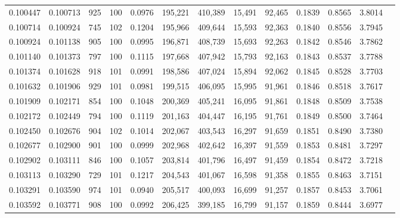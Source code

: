 \begin{tabular}{rrrrrrrrrrrrr}
0.100447 & 0.100713 &   925 & 100 &                                     0.0976 & 195,221 & 410,389 &  15,491 &  92,465 & 0.1839 & 0.8565 & 3.8014 \\
0.100714 & 0.100924 &   745 & 102 &                                     0.1204 & 195,966 & 409,644 &  15,593 &  92,363 & 0.1840 & 0.8556 & 3.7945 \\
0.100924 & 0.101138 &   905 & 100 &                                     0.0995 & 196,871 & 408,739 &  15,693 &  92,263 & 0.1842 & 0.8546 & 3.7862 \\
0.101140 & 0.101373 &   797 & 100 &                                     0.1115 & 197,668 & 407,942 &  15,793 &  92,163 & 0.1843 & 0.8537 & 3.7788 \\
0.101374 & 0.101628 &   918 & 101 &                                     0.0991 & 198,586 & 407,024 &  15,894 &  92,062 & 0.1845 & 0.8528 & 3.7703 \\
0.101632 & 0.101906 &   929 & 101 &                                     0.0981 & 199,515 & 406,095 &  15,995 &  91,961 & 0.1846 & 0.8518 & 3.7617 \\
0.101909 & 0.102171 &   854 & 100 &                                     0.1048 & 200,369 & 405,241 &  16,095 &  91,861 & 0.1848 & 0.8509 & 3.7538 \\
0.102172 & 0.102449 &   794 & 100 &                                     0.1119 & 201,163 & 404,447 &  16,195 &  91,761 & 0.1849 & 0.8500 & 3.7464 \\
0.102450 & 0.102676 &   904 & 102 &                                     0.1014 & 202,067 & 403,543 &  16,297 &  91,659 & 0.1851 & 0.8490 & 3.7380 \\
0.102677 & 0.102900 &   901 & 100 &                                     0.0999 & 202,968 & 402,642 &  16,397 &  91,559 & 0.1853 & 0.8481 & 3.7297 \\
0.102902 & 0.103111 &   846 & 100 &                                     0.1057 & 203,814 & 401,796 &  16,497 &  91,459 & 0.1854 & 0.8472 & 3.7218 \\
0.103113 & 0.103290 &   729 & 101 &                                     0.1217 & 204,543 & 401,067 &  16,598 &  91,358 & 0.1855 & 0.8463 & 3.7151 \\
0.103291 & 0.103590 &   974 & 101 &                                     0.0940 & 205,517 & 400,093 &  16,699 &  91,257 & 0.1857 & 0.8453 & 3.7061 \\
0.103592 & 0.103771 &   908 & 100 &                                     0.0992 & 206,425 & 399,185 &  16,799 &  91,157 & 0.1859 & 0.8444 & 3.6977 \\

\end{tabular}
